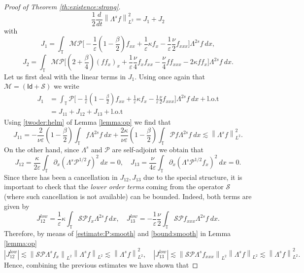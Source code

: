 \documentclass[reqno]{amsart}
\newcommand{\TT}{\mathbb T}
\newcommand{\norm}[1]{\left\lVert#1\right\rVert}
\newcommand\abs[1]{\left|#1\right|}
\theoremstyle{definition}
\numberwithin{equation}{section}
\numberwithin{theorem}{section}
\numberwithin{definition}{section}
\begin{document}
\begin{proof}[Proof of Theorem \ref{th:existence:strong}]
\[
\frac{1}{2}\frac{d}{dt}\norm{\Lambda^{s}f}_{L^{2}}^{2}= J_{1}+J_{2}
\]
with
\[J_{1}= \int_{\TT}  \mathcal{M}\mathcal{P}\bigg[ - \frac{1}{\varepsilon}(1-\frac{\beta}{2})f_{xx}+ \frac{1}{\varepsilon}\kappa f_{x}- \frac{1}{\varepsilon}\frac{\nu}{2}f_{xxx}\bigg] \Lambda^{2s} f \ dx,\]
\[J_{2}=\int_{\TT} \mathcal{M}\mathcal{P}\bigg[\left(2+\frac{\beta}{4}\right)(f f_{x})_{x} + \frac{1}{\varepsilon}\frac{\nu}{4}f_{x}f_{xx}  -\frac{\nu}{4}ff_{xxx}-2\kappa ff_{x}\bigg] \Lambda^{2s} f \ dx. \]
Let us first deal with the linear terms in $J_{1}$. Using once again that $\mathcal{M}=(\mathsf{Id}+\mathcal{S})$ we write
\begin{align*}
J_{1}&=\int_{\TT} \mathcal{P}\bigg[ - \frac{1}{\varepsilon}(1-\frac{\beta}{2})f_{xx}+ \frac{1}{\varepsilon}\kappa f_{x}- \frac{1}{\varepsilon}\frac{\nu}{2}f_{xxx}\bigg] \Lambda^{2s} f \ dx+ \mbox{l.o.t}\\
&= J_{11}+J_{12}+J_{13}+ \mbox{l.o.t}
\end{align*}
Using \eqref{twoder:helm} of Lemma \eqref{lemma:op} we find that 
\[ J_{11}= - \frac{2}{\nu\varepsilon}(1-\frac{\beta}{2}) \int_{\TT} f \Lambda^{2s} f \ dx +  \frac{2\kappa }{\nu\varepsilon}(1-\frac{\beta}{2})\int_{\TT} \mathcal{P}f \Lambda^{2s} f \ dx \lesssim \norm{\Lambda^{s}f}_{L^{2}}^{2}. \]
On the other hand, since $\Lambda^{s}$ and $\mathcal{P}$ are self-adjoint we obtain that 
\[ J_{12}= \frac{\kappa}{2\varepsilon} \int_{\TT} \partial_{x}\left(\Lambda^{s}\mathcal{P}^{1/2} f \right)^{2} \ dx = 0, \quad  J_{13}= \frac{\nu}{4\varepsilon} \int_{\TT} \partial_{x}\left(\Lambda^{s}\mathcal{P}^{1/2} f_{x}\right)^{2} \ dx=0.\]
Since there has been a cancellation in $J_{12}, J_{13}$ due to the special structure, it is important to check that the \textit{lower order terms} coming from the operator $\mathcal{S}$ (where such cancellation is not available) can be bounded. Indeed, both terms are given by
\[ J_{12}^{low}=\frac{1}{\varepsilon}\kappa \int_{\TT} \mathcal{S}\mathcal{P}  f_{x} \Lambda^{2s} f \ dx, \quad J_{13}^{low}= - \frac{1}{\varepsilon}\frac{\nu}{2}\int_{\TT} \mathcal{S}\mathcal{P}  f_{xxx} \Lambda^{2s} f \ dx.\]
Therefore, by means of \eqref{estimate:P:smooth} and \eqref{bound:smooth} in Lemma  \ref{lemma:op} 
\[ \abs{J_{12}^{low}}\lesssim  \norm{\mathcal{S}\mathcal{P} \Lambda^{s} f_{x}}_{L^{2}}\norm{\Lambda^{s}f}_{L^{2}}\lesssim \norm{\Lambda^{s}f}_{L^{2}}^{2}, \quad  \abs{J_{13}^{low}}\lesssim  \norm{\mathcal{S}\mathcal{P} \Lambda^{s} f_{xxx}}_{L^{2}}\norm{\Lambda^{s}f}_{L^{2}}\lesssim \norm{\Lambda^{s}f}_{L^{2}}^{2}.\]
Hence, combining the previous estimates we have shown that

\end{proof}
\end{document}
